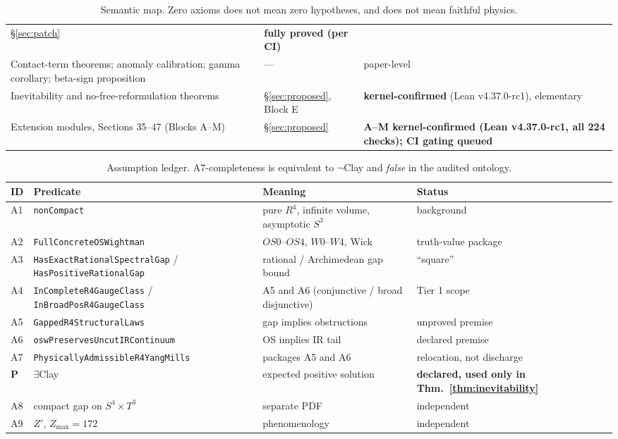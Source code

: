 \documentclass[11pt,a4paper]{article}
\def\R{R}\def\N{N}\def\Q{Q}\def\Z{Z}\def\Class{C}\def\OS{OS}\def\Gap{Gap}%
\theoremstyle{plain}
\theoremstyle{definition}
\theoremstyle{remark}
\newcommand{\R}{\mathbb{R}}\newcommand{\N}{\mathbb{N}}\newcommand{\Q}{\mathbb{Q}}
\newcommand{\Z}{\mathbb{Z}}\newcommand{\Spec}{\operatorname{Spec}}
\newcommand{\OS}{\mathrm{OS}}\newcommand{\Gap}{\mathrm{Gap}}
\newcommand{\Class}{\mathcal{C}}\newcommand{\Htot}{\mathcal{H}}
\renewcommand{\_}{\oldunderscore\allowbreak}
\newcommand{\Lean}[1]{\texttt{\small #1}}
\begin{document}
\begin{table}[htbp]
\begin{tabularx}{\textwidth}{p{4.2cm} X p{2.9cm}}
\S\ref{sec:patch} & \textbf{fully proved (per CI)}\\
Contact-term theorems; anomaly calibration; gamma corollary; beta-sign proposition & --- &
paper-level\\
Inevitability and no-free-reformulation theorems & \S\ref{sec:proposed}, Block E &
\textbf{kernel-confirmed} (Lean v4.37.0-rc1), elementary\\
Extension modules, Sections 35--47 (Blocks A--M) & \S\ref{sec:proposed} & \textbf{A--M kernel-confirmed (Lean v4.37.0-rc1, all 224 checks); CI gating queued}\\
\bottomrule
\end{tabularx}
\caption{Semantic map. Zero axioms does not mean zero hypotheses, and does not mean faithful
physics.}
\label{tab:faith}
\end{table}
\begin{table}[htbp]\centering\small
\renewcommand{\arraystretch}{1.18}
\begin{tabularx}{\textwidth}{p{0.65cm} p{4.8cm} X p{2.35cm}}
\toprule
\textbf{ID} & \textbf{Predicate} & \textbf{Meaning} & \textbf{Status}\\
\midrule
A1 & \Lean{nonCompact} & pure $\R^4$, infinite volume, asymptotic $S^3$ & background\\
A2 & \Lean{FullConcreteOSWightman} & $\OS0$--$\OS4$, $W0$--$W4$, Wick & truth-value package\\
A3 & \Lean{HasExactRationalSpectralGap} / \Lean{HasPositiveRationalGap} & rational / Archimedean gap bound & ``square''\\
A4 & \Lean{InCompleteR4GaugeClass} / \Lean{InBroadPosR4GaugeClass} & A5 and A6 (conjunctive / broad disjunctive) & Tier 1 scope\\
A5 & \Lean{GappedR4StructuralLaws} & gap implies obstructions & unproved premise\\
A6 & \Lean{oswPreservesUncutIRContinuum} & OS implies IR tail & declared premise\\
A7 & \Lean{Physically\allowbreak Admissible\allowbreak R4YangMills} & packages A5 and A6 & relocation, not discharge\\
\textbf{P} & $\exists$Clay & expected positive solution & \textbf{declared, used only in
Thm.~\ref{thm:inevitability}}\\
A8 & compact gap on $S^4\times T^3$ & separate PDF & independent\\
A9 & $Z'$, $Z_{\max}=172$ & phenomenology & independent\\
\bottomrule
\end{tabularx}
\caption{Assumption ledger. A7-completeness is equivalent to $\neg$Clay and \emph{false} in the
audited ontology.}
\label{tab:ledgerA}
\end{table}
\end{document}
